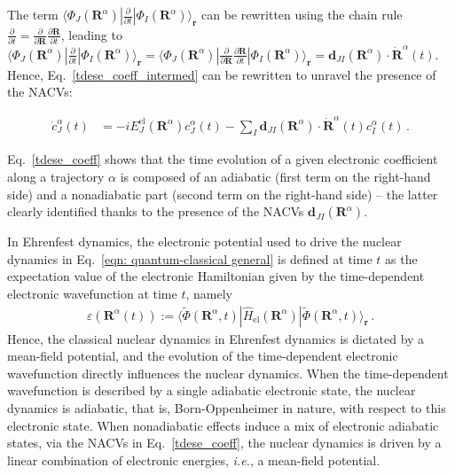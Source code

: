 \documentclass[9pt,bestpractices]{livecoms}
\newcommand{\bra}[1]{\langle #1|}
\newcommand{\ket}[1]{|#1\rangle}
\newcommand{\bs}{\mathbf}
\begin{document}
The term $\bra{\Phi_J(\bs R^{\alpha})} \frac{\partial}{\partial t}\ket{\Phi_I(\bs R^{\alpha})}_{\mathbf{r}}$ can be rewritten using the chain rule $\frac{\partial}{\partial t} = \frac{\partial}{\partial \bs R}\frac{\partial \bs R}{\partial t}$, leading to $\bra{\Phi_J(\bs R^{\alpha})}\frac{\partial}{\partial t}\ket{\Phi_I(\bs R^{\alpha})}_{\mathbf{r}} = \bra{\Phi_J(\bs R^{\alpha})}  \frac{\partial}{\partial \bs R}\frac{\partial \bs R}{\partial t}  \ket{\Phi_I(\bs R^{\alpha})}_{\mathbf{r}} = \bs d_{JI}\left(\bs R^{\alpha}\right)\cdot \dot{\bs R}^{\alpha}(t)$.\cite{hammes94} Hence, Eq.~\eqref{tdese_coeff_intermed} can be rewritten to unravel the presence of the NACVs:

\begin{align}
\dot c_{J}^{\alpha}(t) &= -i  E_J^{\text{el}}\left(\bs R^{\alpha}\right)c_J^{\alpha}(t)-\sum_I  \bs d_{JI}\left(\bs R^{\alpha}\right)\cdot \dot{\bs R}^{\alpha}(t) c_I^{\alpha}(t) \, .
\label{tdese_coeff}
\end{align}

Eq.~\eqref{tdese_coeff} shows that the time evolution of a given electronic coefficient along a trajectory $\alpha$ is composed of an adiabatic (first term on the right-hand side) and a nonadiabatic part (second term on the right-hand side) -- the latter clearly identified thanks to the presence of the NACVs $\bs d_{JI}\left(\bs R^{\alpha}\right)$.

In Ehrenfest dynamics, the electronic potential used to drive the nuclear dynamics in Eq.~\eqref{eqn: quantum-classical general} is defined at time $t$ as the expectation value of the electronic Hamiltonian given by the time-dependent electronic wavefunction at time $t$, namely
\begin{align}
 \varepsilon(\bs R^{\alpha}(t)) := \langle \tilde{\Phi}(\bs R^\alpha,t) | \hat{H}_\text{el}(\bs R^\alpha) | \tilde{\Phi}(\bs R^\alpha,t) \rangle_{\bs r} \,.
\label{ehrenfest}
\end{align}
Hence, the classical nuclear dynamics in Ehrenfest dynamics is dictated by a mean-field potential, and the evolution of the time-dependent electronic wavefunction directly influences the nuclear dynamics. When the time-dependent wavefunction is described by a single adiabatic electronic state, the nuclear dynamics is adiabatic, that is, Born-Oppenheimer in nature, with respect to this electronic state. When nonadiabatic effects induce a mix of electronic adiabatic states, via the NACVs in Eq.~\eqref{tdese_coeff}, the nuclear dynamics is driven by a linear combination of electronic energies, \textit{i.e.}, a mean-field potential.  
\end{document}
